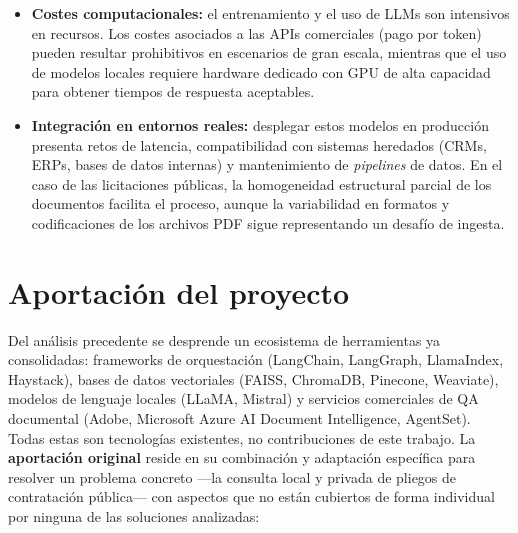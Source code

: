 \begin{itemize}
    \item \textbf{Costes computacionales:} el entrenamiento y el uso de LLMs son intensivos en recursos. Los costes asociados a las APIs comerciales (pago por token) pueden resultar prohibitivos en escenarios de gran escala, mientras que el uso de modelos locales requiere hardware dedicado con GPU de alta capacidad para obtener tiempos de respuesta aceptables.

    \item \textbf{Integración en entornos reales:} desplegar estos modelos en producción presenta retos de latencia, compatibilidad con sistemas heredados (CRMs, ERPs, bases de datos internas) y mantenimiento de \textit{pipelines} de datos. En el caso de las licitaciones públicas, la homogeneidad estructural parcial de los documentos facilita el proceso, aunque la variabilidad en formatos y codificaciones de los archivos PDF sigue representando un desafío de ingesta.
\end{itemize}

\section{Aportación del proyecto}

Del análisis precedente se desprende un ecosistema de herramientas ya consolidadas: frameworks de orquestación (LangChain, LangGraph, LlamaIndex, Haystack), bases de datos vectoriales (FAISS, ChromaDB, Pinecone, Weaviate), modelos de lenguaje locales (LLaMA, Mistral) y servicios comerciales de QA documental (Adobe, Microsoft Azure AI Document Intelligence, AgentSet). Todas estas son tecnologías existentes, no contribuciones de este trabajo. La \textbf{aportación original} reside en su combinación y adaptación específica para resolver un problema concreto —la consulta local y privada de pliegos de contratación pública— con aspectos que no están cubiertos de forma individual por ninguna de las soluciones analizadas:

